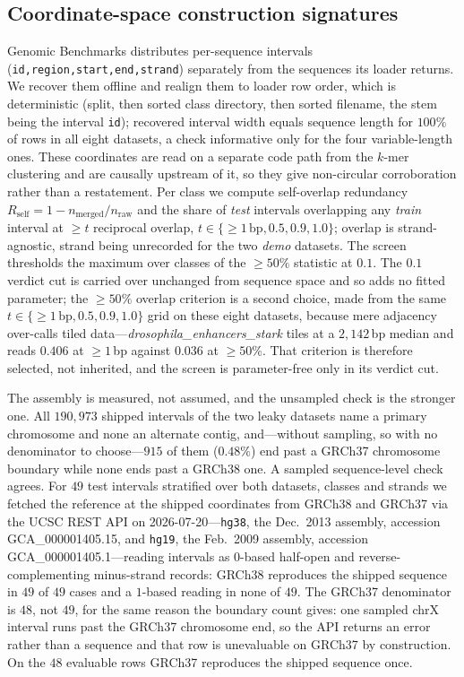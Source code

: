 \documentclass[webpdf,modern,large,namedate]{oup-authoring-template}%
\begin{document}
\subsection{Coordinate-space construction signatures}\label{sec:m-coord}
Genomic Benchmarks distributes per-sequence intervals (\texttt{id,region,start,end,strand}) separately from the sequences its loader returns. We recover them offline and realign them to loader row order, which is deterministic (split, then sorted class directory, then sorted filename, the stem being the interval \texttt{id}); recovered interval width equals sequence length for $100\%$ of rows in all eight datasets, a check informative only for the four variable-length ones. These coordinates are read on a separate code path from the $k$-mer clustering and are causally upstream of it, so they give non-circular corroboration rather than a restatement. Per class we compute self-overlap redundancy $R_{\mathrm{self}}=1-n_{\mathrm{merged}}/n_{\mathrm{raw}}$ and the share of \emph{test} intervals overlapping any \emph{train} interval at $\ge t$ reciprocal overlap, $t\in\{{\ge}1\,\mathrm{bp},0.5,0.9,1.0\}$; overlap is strand-agnostic, strand being unrecorded for the two \textit{demo} datasets. The screen thresholds the maximum over classes of the $\ge50\%$ statistic at $0.1$. The $0.1$ verdict cut is carried over unchanged from sequence space and so adds no fitted parameter; the $\ge50\%$ overlap criterion is a second choice, made from the same $t\in\{{\ge}1\,\mathrm{bp},0.5,0.9,1.0\}$ grid on these eight datasets, because mere adjacency over-calls tiled data---\textit{drosophila\_enhancers\_stark} tiles at a $2{,}142$\,bp median and reads $0.406$ at ${\ge}1$\,bp against $0.036$ at $\ge50\%$. That criterion is therefore selected, not inherited, and the screen is parameter-free only in its verdict cut.

The assembly is measured, not assumed, and the unsampled check is the stronger one. All $190{,}973$ shipped intervals of the two leaky datasets name a primary chromosome and none an alternate contig, and---without sampling, so with no denominator to choose---$915$ of them ($0.48\%$) end past a GRCh37 chromosome boundary while none ends past a GRCh38 one. A sampled sequence-level check agrees. For $49$ test intervals stratified over both datasets, classes and strands we fetched the reference at the shipped coordinates from GRCh38 and GRCh37 via the UCSC REST API on 2026-07-20---\texttt{hg38}, the Dec.\ 2013 assembly, accession GCA\_000001405.15, and \texttt{hg19}, the Feb.\ 2009 assembly, accession GCA\_000001405.1---reading intervals as $0$-based half-open and reverse-complementing minus-strand records: GRCh38 reproduces the shipped sequence in $49$ of $49$ cases and a $1$-based reading in none of $49$. The GRCh37 denominator is $48$, not $49$, for the same reason the boundary count gives: one sampled chrX interval runs past the GRCh37 chromosome end, so the API returns an error rather than a sequence and that row is unevaluable on GRCh37 by construction. On the $48$ evaluable rows GRCh37 reproduces the shipped sequence once.
\end{document}
